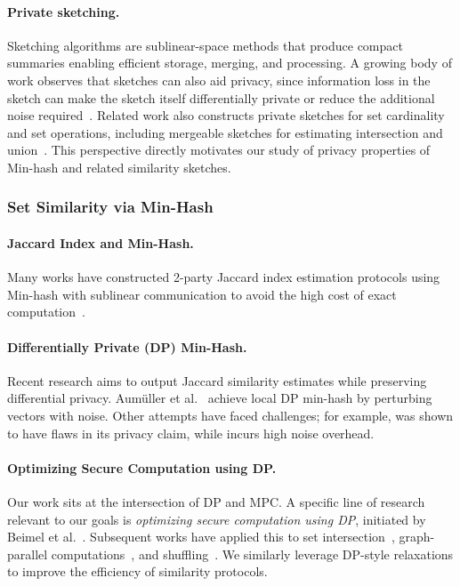 \paragraph{Private sketching.}
Sketching algorithms are sublinear-space methods that produce compact summaries enabling efficient storage, merging, and processing. A growing body of work observes that sketches can also aid privacy, since information loss in the sketch can make the sketch itself differentially private or reduce the additional noise required~\cite{FOCS:BBDS12,choi2020differentially,smith2020flajolet,wang2022differentially,ICML:HehTinCor23,dickens2022order,li2019privacy,pagh2022improved,mir2011pan,melis2015efficient,bassily2015local,bassily2017practical,huang2021frequency,zhao2022differentially}. Related work also constructs private sketches for set cardinality and set operations, including mergeable sketches for estimating intersection and union~\cite{stanojevic2017distributed,sparka2018p2kmv,nunez2020rrtxfm,kreuter2020privacy,pagh_et_al:LIPIcs.ICDT.2021.18,ICML:HehTinCor23}. This perspective directly motivates our study of privacy properties of Min-hash and related similarity sketches.

\subsubsection{Set Similarity via Min-Hash}
\paragraph{Jaccard Index and Min-Hash.}
Many works have constructed 2-party Jaccard index estimation protocols using Min-hash with sublinear communication to avoid the high cost of exact computation~\cite{wpes:CFGT12,eprint:RCSWK19,Faber:thesis}.

\paragraph{Differentially Private (DP) Min-Hash.}
Recent research aims to output Jaccard similarity estimates while preserving differential privacy. Aum{\"u}ller et al.~\cite{sisap:AumBouSch20} achieve local DP min-hash by perturbing vectors with noise. Other attempts have faced challenges; for example, \cite{conc:YWRLLQ19} was shown to have flaws in its privacy claim, while \cite{arxiv:YLLHQ17} incurs high noise overhead.

\paragraph{Optimizing Secure Computation using DP.}
Our work sits at the intersection of DP and MPC. A specific line of research relevant to our goals is \emph{optimizing secure computation using DP}, initiated by Beimel et al.~\cite{BNO08}. Subsequent works have applied this to set intersection~\cite{CCS:HMFS17,PETS:GroRinRos19}, graph-parallel computations~\cite{CCS:MazGor18}, and shuffling~\cite{ACNS:GKLX22}. We similarly leverage DP-style relaxations to improve the efficiency of similarity protocols.


